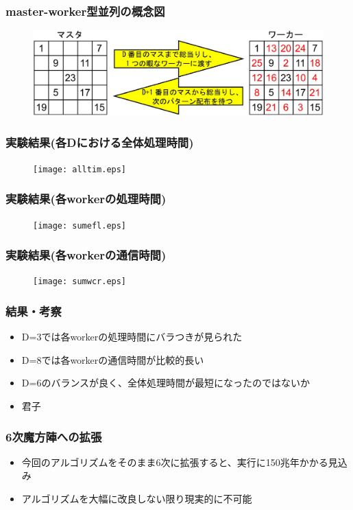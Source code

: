 \documentclass[dvipdfmx,20pt,notheorems,t]{beamer}
\begin{document}
\begin{frame}\frametitle{master-worker型並列の概念図}
\begin{figure}[htb]
\centering
\includegraphics[width=\textwidth]{master-worker-proc.eps}
\end{figure}
\end{frame}

\begin{frame}\frametitle{実験結果(各Dにおける全体処理時間)}
\begin{figure}[htb]
\centering
\texttt{[image: alltim.eps]}
\end{figure}
\end{frame}

\begin{frame}\frametitle{実験結果(各workerの処理時間)}
\begin{figure}[htb]
\centering
\texttt{[image: sumefl.eps]}
\end{figure}
\end{frame}

\begin{frame}\frametitle{実験結果(各workerの通信時間)}
\begin{figure}[htb]
\centering
\texttt{[image: sumwcr.eps]}
\end{figure}
\end{frame}

\begin{frame}\frametitle{結果・考察}
\begin{itemize}
\item D=3では各workerの処理時間にバラつきが見られた
\item D=8では各workerの通信時間が比較的長い
\item D=6のバランスが良く、全体処理時間が最短になったのではないか
\item 君子
\end{itemize}
\end{frame}

\begin{frame}\frametitle{6次魔方陣への拡張}
\begin{itemize}
\item 今回のアルゴリズムをそのまま6次に拡張すると、実行に150兆年かかる見込み
\item アルゴリズムを大幅に改良しない限り現実的に不可能
\end{itemize}
\end{frame}
\end{document}
